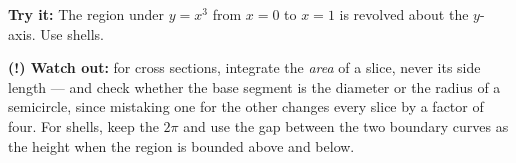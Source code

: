 \documentclass[12pt]{article}
\begin{document}
\begin{tryitbox}
\textbf{Try it:} The region under $y = x^3$ from $x = 0$ to $x = 1$ is revolved
about the $y$-axis. Use shells.\\[2pt]
\end{tryitbox}

\begin{watchoutbox}
\textbf{(!) Watch out:} for cross sections, integrate the \emph{area} of a
slice, never its side length --- and check whether the base segment is the
diameter or the radius of a semicircle, since mistaking one for the other
changes every slice by a factor of four. For shells, keep the $2\pi$ and use
the gap between the two boundary curves as the height when the region is
bounded above and below.
\end{watchoutbox}
\end{document}
